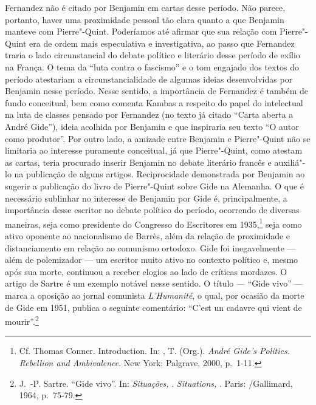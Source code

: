 Fernandez não é citado por Benjamin em cartas desse período. Não parece,
portanto, haver uma proximidade pessoal tão clara quanto a que Benjamin
manteve com Pierre"-Quint. Poderíamos até afirmar que sua relação com
Pierre"-Quint era de ordem mais especulativa e investigativa, ao passo
que Fernandez traria o lado circunstancial do debate político e
literário desse período de exílio na França. O tema da ``luta contra o
fascismo'' e o tom engajado dos textos do período atestariam a
circunstancialidade de algumas ideias desenvolvidas por Benjamin nesse
período. Nesse sentido, a importância de Fernandez é também de fundo
conceitual, bem como comenta Kambas a respeito do papel do intelectual
na luta de classes pensado por Fernandez (no texto já citado ``Carta
aberta a André Gide''), ideia acolhida por Benjamin e que inspiraria seu
texto ``O autor como produtor''. Por outro lado, a amizade entre
Benjamin e Pierre"-Quint não se limitaria ao interesse puramente
conceitual, já que Pierre"-Quint, como atestam as cartas, teria procurado
inserir Benjamin no debate literário francês e auxiliá"-lo na publicação
de alguns artigos. Reciprocidade demonstrada por Benjamin ao sugerir a %
publicação do livro de Pierre"-Quint sobre Gide na Alemanha. O que é
necessário sublinhar no interesse de Benjamin por Gide é,
principalmente, a importância desse escritor no debate político do
período, ocorrendo de diversas maneiras, seja como presidente do
Congresso do Escritores em 1935,\footnote{Cf. Thomas Conner.
  Introduction. In: , T. (Org.). \emph{André Gide's Politics.
  Rebellion and Ambivalence}. New York: Palgrave, 2000, p.~1-11.} seja
como ativo oponente ao nacionalismo de Barrès, além da relação de
proximidade e distanciamento em relação ao comunismo ortodoxo. Gide foi
inegavelmente --- além de polemizador --- um escritor muito ativo no
contexto político e, mesmo após sua morte, continuou a receber elogios
ao lado de críticas mordazes. O artigo de Sartre é um exemplo notável
nesse sentido. O título --- ``Gide vivo'' --- marca a oposição ao jornal
comunista \emph{L'Humanité}, o qual, por ocasião da morte de Gide em
1951, publica o seguinte comentário: ``C'est un cadavre qui vient de
mourir''.\footnote{J.~-P. Sartre. ``Gide vivo''. In: \emph{Situações, }.
  \emph{Situations, }. Paris: /Gallimard, 1964, p.~75-79.}

